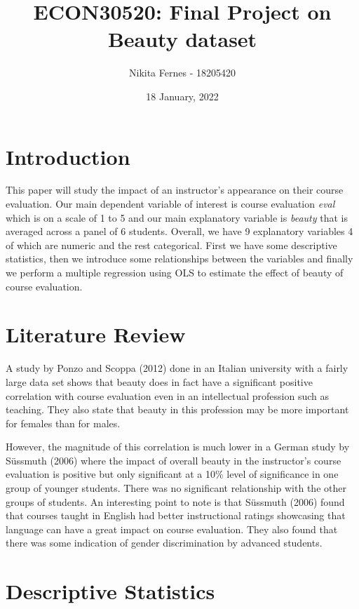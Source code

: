 \documentclass[
  12 pt,
]{article}
\title{ECON30520: Final Project on Beauty dataset}
\author{Nikita Fernes - 18205420}
\date{18 January, 2022}
\begin{document}
\maketitle

\hypertarget{introduction}{%
\section{Introduction}\label{introduction}}

This paper will study the impact of an instructor's appearance on their course evaluation. Our main dependent variable of interest is course evaluation \emph{eval} which is on a scale of 1 to 5 and our main explanatory variable is \emph{beauty} that is averaged across a panel of 6 students. Overall, we have 9 explanatory variables 4 of which are numeric and the rest categorical. First we have some descriptive statistics, then we introduce some relationships between the variables and finally we perform a multiple regression using OLS to estimate the effect of beauty of course evaluation.

\hypertarget{literature-review}{%
\section{Literature Review}\label{literature-review}}

A study by Ponzo and Scoppa (2012) done in an Italian university with a fairly large data set shows that beauty does in fact have a significant positive correlation with course evaluation even in an intellectual profession such as teaching. They also state that beauty in this profession may be more important for females than for males.

However, the magnitude of this correlation is much lower in a German study by Süssmuth (2006) where the impact of overall beauty in the instructor's course evaluation is positive but only significant at a 10\% level of significance in one group of younger students. There was no significant relationship with the other groups of students. An interesting point to note is that Süssmuth (2006) found that courses taught in English had better instructional ratings showcasing that language can have a great impact on course evaluation. They also found that there was some indication of gender discrimination by advanced students.

\hypertarget{descriptive-statistics}{%
\section{Descriptive Statistics}\label{descriptive-statistics}}
\end{document}
